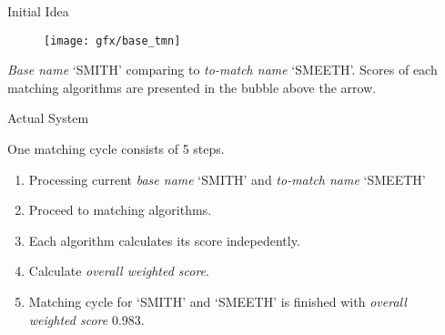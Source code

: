 \documentclass[final]{beamer}
\newlength{\onecolwid}
\newlength{\twocolwid}
\begin{document}
\begin{frame}[t]
\begin{columns}[t]
\begin{column}{\twocolwid} %

\begin{columns}[t,totalwidth=\twocolwid] %

\begin{column}{\onecolwid}\vspace{-.4in} %

\begin{block}{Initial Idea}

\begin{figure}
\texttt{[image: gfx/base\_tmn]}
\end{figure}

\emph{Base name}
`SMITH' comparing to \emph{to-match name} `SMEETH'.
Scores of each matching algorithms
are presented in the bubble above the arrow.

\end{block}

\begin{block}{Actual System}
\begin{figure}
\end{figure}

One matching cycle consists of 5 steps.

\begin{enumerate}
  \item Processing current \emph{base name} `SMITH' and \emph{to-match name} `SMEETH'
  \item Proceed to matching algorithms.
  \item Each algorithm calculates its score indepedently.
  \item Calculate \emph{overall weighted score}.
  \item Matching cycle for `SMITH' and `SMEETH' is finished with
    \emph{overall weighted score} 0.983.
\end{enumerate}

\end{block}

\end{column} %

\begin{column}{\onecolwid}\vspace{-.4in} %


\end{column}
\end{columns}
\end{column}
\end{columns}
\end{frame}
\end{document}
